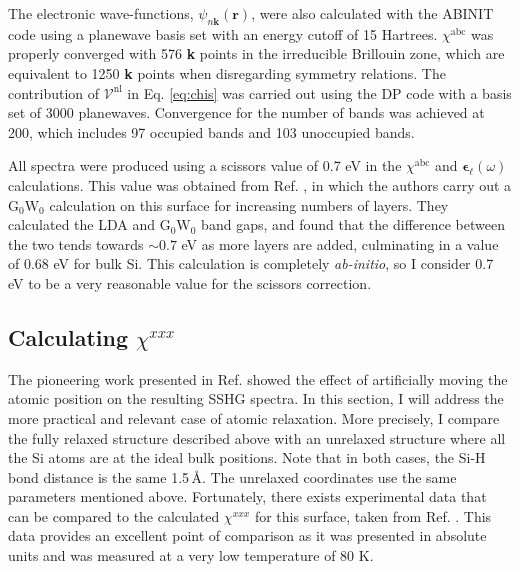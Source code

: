 The electronic wave-functions, $\psi_{n\mathbf{k}}(\mathbf{r})$, were also
calculated with the ABINIT code using a planewave basis set with an energy
cutoff of 15 Hartrees. $\chi^{\mathrm{abc}}$ was properly converged with 576
\textbf{k} points in the irreducible Brillouin zone, which are equivalent to
1250 \textbf{k} points when disregarding symmetry relations. The contribution of
$\boldsymbol{\mathcal{V}}^\mathrm{nl}$ in Eq. \eqref{eq:chis} was carried out
using the DP\cite{olevanoDP} code with a basis set of 3000 planewaves.
Convergence for the number of bands was achieved at 200, which includes 97
occupied bands and 103 unoccupied bands.

All spectra were produced using a scissors value of 0.7 eV in the
$\chi^{\mathrm{abc}}$ and $\boldsymbol{\epsilon}_{\ell}(\omega)$ calculations.
This value was obtained from Ref. \cite{liPRB10}, in which the authors carry out
a $\mathrm{G}_{0}\mathrm{W}_{0}$ calculation on this surface for increasing
numbers of layers. They calculated the LDA and $\mathrm{G}_{0}\mathrm{W}_{0}$
band gaps, and found that the difference between the two tends towards
$\sim0.7$ eV as more layers are added, culminating in a value of 0.68 eV for
bulk Si. This calculation is completely \emph{ab-initio}, so I consider 0.7 eV
to be a very reasonable value for the scissors correction.



\subsection{Calculating \texorpdfstring{$\chi^{xxx}$}{Xxxx}}
\label{sec:res1x1chi}

The pioneering work presented in Ref. \cite{mejiaPRB02} showed the effect of
artificially moving the atomic position on the resulting SSHG spectra. In this
section, I will address the more practical and relevant case of atomic
relaxation. More precisely, I compare the fully relaxed structure described
above with an unrelaxed structure where all the Si atoms are at the ideal bulk
positions. Note that in both cases, the Si-H bond distance is the same 1.5\,\AA.
The unrelaxed coordinates use the same parameters mentioned above. Fortunately,
there exists experimental data that can be compared to the calculated
$\chi^{xxx}$ for this surface, taken from Ref. \cite{hoferAPA96}. This data
provides an excellent point of comparison as it was presented in absolute units
and was measured at a very low temperature of 80 K.

